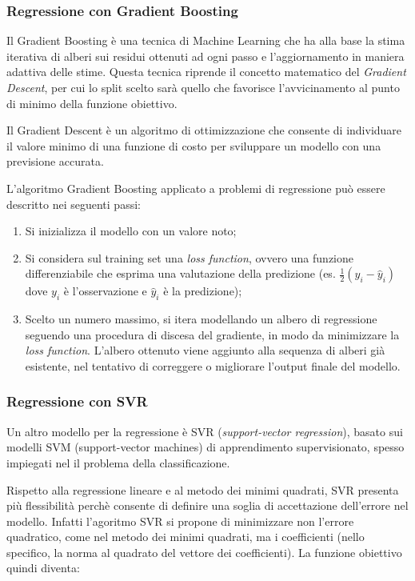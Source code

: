 \subsubsection{Regressione con Gradient Boosting}\label{sssec:regressione-gb}
Il Gradient Boosting è una tecnica di Machine Learning che ha alla base la stima iterativa di alberi sui residui ottenuti ad ogni passo e l’aggiornamento in maniera adattiva delle stime. Questa tecnica riprende il concetto matematico del \textit{Gradient Descent}, per cui lo split scelto sarà quello che favorisce l’avvicinamento al punto di minimo della funzione obiettivo.

Il Gradient Descent è un algoritmo di ottimizzazione che consente di individuare il valore minimo di una funzione di costo per sviluppare un modello con una previsione accurata.

L’algoritmo Gradient Boosting applicato a problemi di regressione può essere descritto nei seguenti passi:

\begin{enumerate}
  \item Si inizializza il modello con un valore noto;
  \item Si considera sul training set una \textit{loss function}, ovvero una funzione differenziabile che esprima una valutazione della predizione (es. $\frac{1}{2} (y_i - \hat{y}_{i})$ dove $y_i$ è l'osservazione e $\hat{y}_{i}$ è la predizione);
  \item Scelto un numero massimo, si itera modellando un albero di regressione seguendo una procedura di discesa del gradiente, in modo da minimizzare la \textit{loss function}. L'albero ottenuto viene aggiunto alla sequenza di alberi già esistente, nel tentativo di correggere o migliorare l'output finale del modello.
\end{enumerate}


\subsubsection{Regressione con SVR}\label{sssec:regressione-svr}
Un altro modello per la regressione è SVR (\textit{support-vector regression}), basato sui modelli SVM (support-vector machines) di apprendimento supervisionato, spesso impiegati nel il problema della classificazione. \cite{svm}

Rispetto alla regressione lineare e al metodo dei minimi quadrati, SVR presenta più flessibilità perchè consente di definire una soglia di accettazione dell'errore nel modello. Infatti l'agoritmo SVR si propone di minimizzare non l'errore quadratico, come nel metodo dei minimi quadrati, ma i coefficienti (nello specifico, la norma al quadrato del vettore dei coefficienti). La funzione obiettivo quindi diventa:

